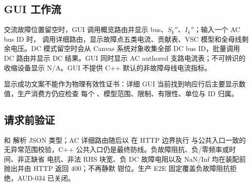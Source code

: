 \subsection{GUI 工作流}

交流故障位置留空时，GUI 调用概览路由并显示 bus、$S_k''$、$I_k''$；输入一个 AC bus ID 时，
调用详细路由，显示故障点五类电流、贡献表、VSC 模型和全母线剩余电压。DC 模式留空时会从
Canvas 系统对象收集全部 DC bus ID，批量调用 DC 路由并显示 DC 结果。GUI 同时显示 AC
authored 支路电流表；不可辨识的收缩设备显示 N/A。GUI 不提供 C++ 默认的非故障母线电流指标。

显示成功文案不能作为物理有效性证书：详细 GUI 当前找到响应行后主要显示数值，生产消费方仍应检查
每个 、模型范围、限制、有限性、单位与 ID 归属。

\subsection{请求前验证}

 和  解析 JSON
类型；AC 详细路由随后以  在 HTTP 边界执行
与公共入口一致的无异常范围校验，C++ 公共入口仍是最终防线。负故障阻抗、负/零频率或时间、非正缺省
电抗、非法 RHS 块宽、负 DC 故障电阻以及 NaN/Inf 均在装配前抛出并由 HTTP 返回 400；不再静默
钳位。生产 E2E 固定覆盖负故障阻抗拒绝，AUD-034 已关闭。
